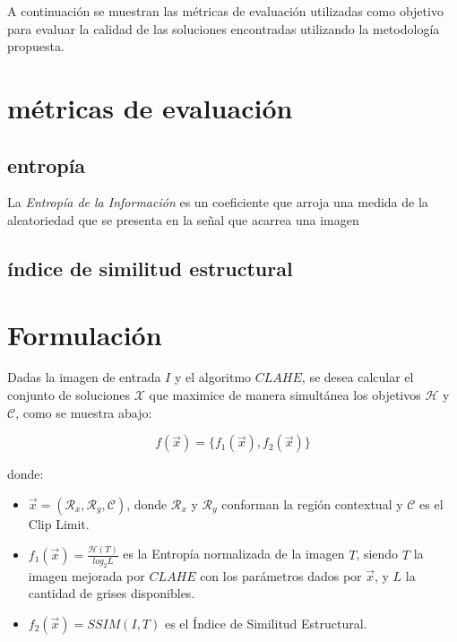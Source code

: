 \documentclass[spanish]{article}
\begin{document}
A continuación se muestran las métricas de evaluación utilizadas como objetivo para evaluar la calidad de las soluciones encontradas utilizando la metodología propuesta.

\section{métricas de evaluación}
\label{sec:metricas}

\subsection{entropía}
\label{ssec:entropia}

La {\it Entropía de la Información} es un coeficiente que arroja una medida de la aleatoriedad que se presenta en la señal que acarrea una imagen \cite{tsai2008information}

\subsection{índice de similitud estructural}
\label{ssec:ssim}
\section{Formulación}
\label{sec:formulacion}

Dadas la imagen de entrada $I$ y el algoritmo $CLAHE$, se desea calcular el conjunto de soluciones $\mathscr{X}$ que maximice de manera simultánea los objetivos $\mathscr{H}$ y $\mathcal{C}$, como se muestra abajo:

\begin{equation}\label{eq:fitness}
    f(\overrightarrow{x}) = \{ f_1(\overrightarrow{x}), f_2(\overrightarrow{x}) \}
\end{equation}

donde:
\begin{itemize}
\item $\overrightarrow{x}=(\mathcal{R}_x, \mathcal{R}_y, \mathcal{C})$, donde $\mathcal{R}_x$ y $\mathcal{R}_y$ conforman la región contextual y $\mathscr{C}$ es el Clip Limit.
\item $f_{1}(\overrightarrow{x})=\frac{\mathscr{H}(T)}{log_{2}L}$ es la Entropía normalizada de la imagen $T$, siendo $T$ la imagen mejorada por $CLAHE$ con los parámetros dados por $\overrightarrow{x}$, y $L$ la cantidad de grises disponibles.
\item $f_{2}(\overrightarrow{x})=SSIM(I,T)$ es el Índice de Similitud Estructural.
\end{itemize}
\end{document}
